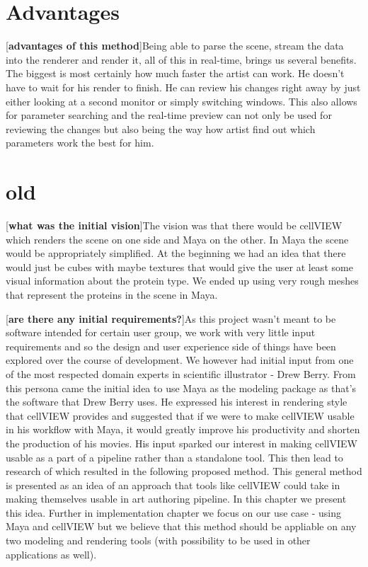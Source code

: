 \documentclass[
  digital, %
  table,   %
  nolof,     %
  nolot,     %
]{fithesis3}
\begin{document}
\section{Advantages}
[\textbf{advantages of this method}]Being able to parse the scene, stream the data into the renderer and render it, all of this in real-time, brings us several benefits. The biggest is most certainly how much faster the artist can work. He doesn't have to wait for his render to finish. He can review his changes right away by just either looking at a second monitor or simply switching windows. This also allows for parameter searching and the real-time preview can not only be used for reviewing the changes but also being the way how artist find out which parameters work the best for him.

\section{old}
[\textbf{what was the initial vision}]The vision was that there would be cellVIEW which renders the scene on one side and Maya on the other. In Maya the scene would be appropriately simplified. At the beginning we had an idea that there would just be cubes with maybe textures that would give the user at least some visual information about the protein type. We ended up using very rough meshes that represent the proteins in the scene in Maya.

[\textbf{are there any initial requirements?}]As this project wasn't meant to be software intended for certain user group, we work with very little input requirements and so the design and user experience side of things have been explored over the course of development. We however had initial input from one of the most respected domain experts in scientific illustrator - Drew Berry. From this persona came the initial idea to use Maya as the modeling package as that's the software that Drew Berry uses. He expressed his interest in rendering style that cellVIEW provides and suggested that if we were to make cellVIEW usable in his workflow with Maya, it would greatly improve his productivity and shorten the production of his movies. His input sparked our interest in making cellVIEW usable as a part of a pipeline rather than a standalone tool. This then lead to research of which resulted in the following proposed method. This general method is presented as an idea of an approach that tools like cellVIEW could take in making themselves usable in art authoring pipeline. In this chapter we present this idea. Further in implementation chapter we focus on our use case - using Maya and cellVIEW but we believe that this method should be appliable on any two modeling and rendering tools (with possibility to be used in other applications as well).
\end{document}
